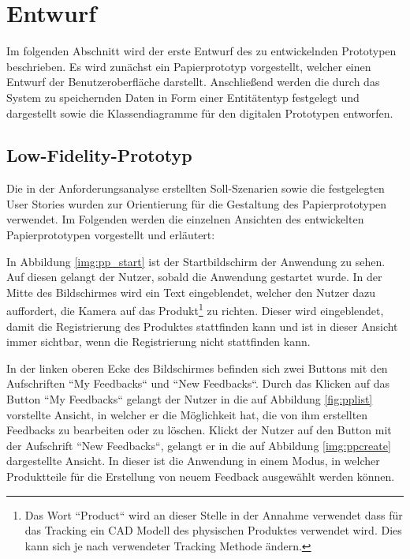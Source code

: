 \section{Entwurf}\label{entwurf}

Im folgenden Abschnitt wird der erste Entwurf des zu entwickelnden Prototypen beschrieben. Es wird zunächst ein Papierprototyp vorgestellt, welcher einen Entwurf der Benutzeroberfläche darstellt. Anschließend werden die durch das System zu speichernden Daten in Form einer Entitätentyp festgelegt und dargestellt sowie die Klassendiagramme für den digitalen Prototypen entworfen.  

\subsection{Low-Fidelity-Prototyp}\label{lowfi}

Die in der Anforderungsanalyse erstellten Soll-Szenarien sowie die festgelegten User Stories wurden zur Orientierung für die Gestaltung des Papierprototypen verwendet.
Im Folgenden werden die einzelnen Ansichten des entwickelten Papierprototypen vorgestellt und erläutert: 

In Abbildung \ref{img:pp_start} ist der Startbildschirm der Anwendung zu sehen. Auf diesen gelangt der Nutzer, sobald die Anwendung gestartet wurde. 
In der Mitte des Bildschirmes wird ein Text eingeblendet, welcher den Nutzer dazu auffordert, die Kamera auf das Produkt\footnote{Das Wort ``Product`` wird an dieser Stelle in der Annahme verwendet dass für das Tracking ein CAD Modell des physischen Produktes verwendet wird. Dies kann sich je nach verwendeter Tracking Methode ändern.} zu richten. Dieser wird eingeblendet, damit die Registrierung des Produktes stattfinden kann und ist in dieser Ansicht immer sichtbar, wenn die Registrierung nicht stattfinden kann.

In der linken oberen Ecke des Bildschirmes befinden sich zwei Buttons mit den Aufschriften ``My Feedbacks`` und ``New Feedbacks``. Durch das Klicken auf das Button ``My Feedbacks`` gelangt der Nutzer in 
die auf Abbildung \ref{fig:pplist} vorstellte Ansicht, in welcher er die Möglichkeit hat, die von ihm erstellten Feedbacks zu bearbeiten oder zu löschen. Klickt der Nutzer auf den Button mit der Aufschrift 
``New Feedbacks``, gelangt er in die auf Abbildung \ref{img:ppcreate} dargestellte Ansicht. In dieser ist die Anwendung in einem Modus, in welcher Produktteile für die Erstellung von neuem Feedback ausgewählt werden können. 


